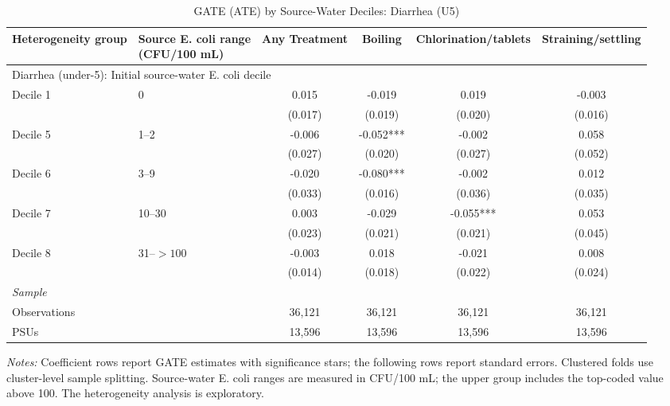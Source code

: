 \begin{landscape}
\begin{table}[p]
\centering
\caption{GATE (ATE) by Source-Water Deciles: Diarrhea (U5)}
\label{tab:table_gate_main_deciles-diarrhea}
\scriptsize\setlength{\tabcolsep}{4pt}
\begin{adjustbox}{max width=\linewidth, center}
\begin{tabular}{llcccc}
\toprule
Heterogeneity group & \shortstack{Source E. coli range\\(CFU/100 mL)} & Any Treatment & Boiling & Chlorination/tablets & Straining/settling \\
\midrule
\multicolumn{6}{l}{Diarrhea (under-5): Initial source-water E. coli decile} \\
Decile 1 & 0 & 0.015 & -0.019 & 0.019 & -0.003 \\
 &  & (0.017) & (0.019) & (0.020) & (0.016) \\
Decile 5 & 1--2 & -0.006 & -0.052*** & -0.002 & 0.058 \\
 &  & (0.027) & (0.020) & (0.027) & (0.052) \\
Decile 6 & 3--9 & -0.020 & -0.080*** & -0.002 & 0.012 \\
 &  & (0.033) & (0.016) & (0.036) & (0.035) \\
Decile 7 & 10--30 & 0.003 & -0.029 & -0.055*** & 0.053 \\
 &  & (0.023) & (0.021) & (0.021) & (0.045) \\
Decile 8 & 31--$>100$ & -0.003 & 0.018 & -0.021 & 0.008 \\
 &  & (0.014) & (0.018) & (0.022) & (0.024) \\
\multicolumn{6}{l}{\textit{Sample}} \\
\quad Observations &  & 36,121 & 36,121 & 36,121 & 36,121 \\
\quad PSUs &  & 13,596 & 13,596 & 13,596 & 13,596 \\
\bottomrule
\end{tabular}
\end{adjustbox}
\par\vspace{3pt}
\begin{minipage}{\linewidth}\footnotesize \textit{Notes:} Coefficient rows report GATE estimates with significance stars; the following rows report standard errors. Clustered folds use cluster-level sample splitting. Source-water E. coli ranges are measured in CFU/100 mL; the upper group includes the top-coded value above 100. The heterogeneity analysis is exploratory.\end{minipage}
\end{table}
\end{landscape}